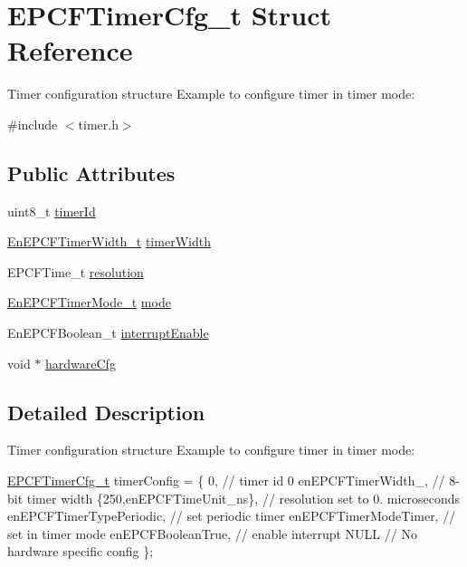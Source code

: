 \hypertarget{structEPCFTimerCfg__t}{}\section{E\+P\+C\+F\+Timer\+Cfg\+\_\+t Struct Reference}
\label{structEPCFTimerCfg__t}


Timer configuration structure Example to configure timer in timer mode\+:  




{\ttfamily \#include $<$timer.\+h$>$}

\subsection*{Public Attributes}
\begin{DoxyCompactItemize}
\item 
uint8\+\_\+t \mbox{\hyperlink{structEPCFTimerCfg__t_a3d76ca6bd21e3c79c1108bfd5ca12203}{timer\+Id}}
\item 
\mbox{\hyperlink{timer_8h_a88093e16b89eaa9d2df5fc6285cffa9f}{En\+E\+P\+C\+F\+Timer\+Width\+\_\+t}} \mbox{\hyperlink{structEPCFTimerCfg__t_a4e6c52d71b02feed17bf2a82f52e0dd5}{timer\+Width}}
\item 
E\+P\+C\+F\+Time\+\_\+t \mbox{\hyperlink{structEPCFTimerCfg__t_a95ab8d358214e80efc33d4ab5eafebe4}{resolution}}
\item 
\mbox{\hyperlink{timer_8h_a51bff4a4babb9c83592664dca0f1f0e8}{En\+E\+P\+C\+F\+Timer\+Mode\+\_\+t}} \mbox{\hyperlink{structEPCFTimerCfg__t_a4bef5bcf1cd65caba288be72df84d8fb}{mode}}
\item 
En\+E\+P\+C\+F\+Boolean\+\_\+t \mbox{\hyperlink{structEPCFTimerCfg__t_affb91a9f214e3b46db718c62db7d4726}{interrupt\+Enable}}
\item 
void $\ast$ \mbox{\hyperlink{structEPCFTimerCfg__t_a6de81a71c26c282153e6d1be3f3be0cd}{hardware\+Cfg}}
\end{DoxyCompactItemize}


\subsection{Detailed Description}
Timer configuration structure Example to configure timer in timer mode\+: 

\mbox{\hyperlink{structEPCFTimerCfg__t}{E\+P\+C\+F\+Timer\+Cfg\+\_\+t}} timer\+Config = \{ 0, // timer id 0 en\+E\+P\+C\+F\+Timer\+Width\+\_, // 8-\/bit timer width \{250,en\+E\+P\+C\+F\+Time\+Unit\+\_\+ns\}, // resolution set to 0. microseconds en\+E\+P\+C\+F\+Timer\+Type\+Periodic, // set periodic timer en\+E\+P\+C\+F\+Timer\+Mode\+Timer, // set in timer mode en\+E\+P\+C\+F\+Boolean\+True, // enable interrupt N\+U\+LL // No hardware specific config \}; 

